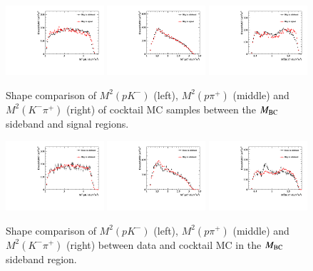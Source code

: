 \begin{figure}[H]\centering
    \includegraphics[width=0.325\textwidth]{figure/sideband/output_mc_0_sideband_signal_m2_12_2c_1.pdf}
    \includegraphics[width=0.325\textwidth]{figure/sideband/output_mc_0_sideband_signal_m2_13_2c_1.pdf}
    \includegraphics[width=0.325\textwidth]{figure/sideband/output_mc_0_sideband_signal_m2_23_2c_1.pdf}
    \caption{Shape comparison of $M^2(pK^-)$ (left), $M^2(p\pi^+)$ (middle) and $M^2(K^-\pi^+)$ (right) of cocktail MC samples between the $M_{\rm{BC}}$ sideband and signal regions.}
\label{fig:comp_mc_sideband}
\end{figure}

\begin{figure}[H]\centering
    \includegraphics[width=0.325\textwidth]{figure/sideband/output_data_mc_0_sideband_m2_12_2c_1.pdf}
    \includegraphics[width=0.325\textwidth]{figure/sideband/output_data_mc_0_sideband_m2_13_2c_1.pdf}
    \includegraphics[width=0.325\textwidth]{figure/sideband/output_data_mc_0_sideband_m2_23_2c_1.pdf}
    \caption{Shape comparison of $M^2(pK^-)$ (left), $M^2(p\pi^+)$ (middle) and $M^2(K^-\pi^+)$ (right) between data and cocktail MC in the $M_{\rm{BC}}$ sideband region.}
\label{fig:comp_datamc_sideband}
\end{figure}